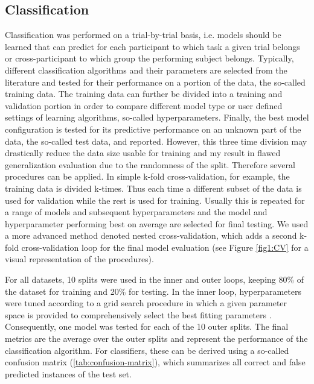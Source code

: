 \subsection{Classification}
Classification was performed on a trial-by-trial basis, i.e. models should be learned that can predict for each participant to which task a given trial belongs or cross-participant to which group the performing subject belongs. Typically, different classification algorithms and their parameters are selected from the literature and tested for their performance on a portion of the data, the so-called training data. The training data can further be divided into a training and validation portion in order to compare different model type or user defined settings of learning algorithms, so-called hyperparameters. Finally, the best model configuration is tested for its predictive performance on an unknown part of the data, the so-called test data, and reported. However, this three time division may drastically reduce the data size usable for training and my result in flawed generalization evaluation due to the randomness of the split. Therefore several procedures can be applied. In simple k-fold cross-validation, for example, the training data is divided k-times. Thus each time a different subset of the data is used for validation while the rest is used for training. Usually this is repeated for a range of models and subsequent hyperparameters and the model and hyperparameter performing best on average are selected for final testing. We used a more advanced method denoted nested cross-validation, which adds a second k-fold cross-validation loop for the final model evaluation (see Figure \ref{fig1:CV} for a visual representation of the procedures). 

\begin{figure*}[h]
  \caption{Cross-validation procedures}
  \label{fig1:CV}
\end{figure*}

For all datasets, 10 splits were used in the inner and outer loops, keeping 80\% of the dataset for training and 20\% for testing. In the inner loop, hyperparameters were tuned according to a grid search procedure in which a given parameter space is provided to comprehensively select the best fitting parameters \cite{VAROQUAUX2017166}. Consequently, one model was tested for each of the 10 outer splits. The final metrics are the average over the outer splits and represent the performance of the classification algorithm. For classifiers, these can be derived using a so-called confusion matrix (\autoref{tab:confusion-matrix}), which summarizes all correct and false predicted instances of the test set.  

